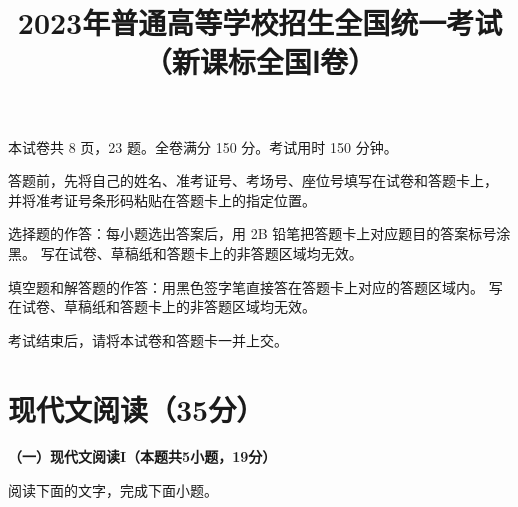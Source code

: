 \documentclass{exam-zh}
\title{2023年普通高等学校招生全国统一考试（新课标全国Ⅰ卷）}
\begin{document}

\secret

\maketitle

\begin{center}
    本试卷共 8 页，23 题。全卷满分 150 分。考试用时 150 分钟。
\end{center}



\begin{notice}
  \item 答题前，先将自己的姓名、准考证号、考场号、座位号填写在试卷和答题卡上，
    并将准考证号条形码粘贴在答题卡上的指定位置。
  \item 选择题的作答：每小题选出答案后，用 2B 铅笔把答题卡上对应题目的答案标号涂黑。
    写在试卷、草稿纸和答题卡上的非答题区域均无效。
  \item 填空题和解答题的作答：用黑色签字笔直接答在答题卡上对应的答题区域内。
    写在试卷、草稿纸和答题卡上的非答题区域均无效。
  \item 考试结束后，请将本试卷和答题卡一并上交。
\end{notice}



\section{%
现代文阅读（35分）
}

{\bfseries（一）现代文阅读I（本题共5小题，19分）}

阅读下面的文字，完成下面小题。
\end{document}
